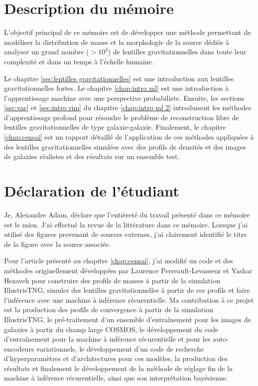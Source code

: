 \section{Description du mémoire}

L'objectif principal de ce mémoire est de développer une méthode permettant de 
modéliser la distribution de masse et 
la morphologie de la source dédiée à analyser un grand nombre ($> 10^{3}$)
de lentilles gravitationnelles dans toute leur complexité et dans un temps à l'échelle humaine. 

Le chapitre \ref{sec:lentilles gravitationnelles} est une introduction aux lentilles gravitationnelles fortes. Le chapitre \ref{chap:intro ml} est 
une introduction à l'apprentissage machine avec une perspective probabiliste. Ensuite, 
les sections \ref{sec:vae} et \ref{sec:intro rim} du chapitre \ref{chap:intro ml 2} introduisent les méthodes d'apprentissage profond 
pour résoudre le problème de reconstruction libre de lentilles gravitationnelles de type galaxie-galaxie. 
Finalement, le chapitre \ref{chap:censai} est un rapport détaillé de l'application de ces méthodes 
appliquées à des lentilles gravitationnelles simulées 
avec des profils de densités et des images de galaxies réalistes 
et des résultats sur un ensemble test. 

\section{Déclaration de l'étudiant}
Je, Alexandre Adam, déclare que l'entièreté du travail présenté dans ce mémoire est le mien. J'ai effectué la revue de 
la littérature dans ce mémoire. Lorsque j'ai utilisé des figures provenant de sources externes, j'ai clairement 
identifié le titre de la figure avec la source associée.

Pour l'article présenté au chapitre \ref{chap:censai}, j'ai modifié un code et des méthodes originellement 
développées par Laurence Perreault-Levasseur et Yashar Hezaveh pour construire des profils de masses à partir 
de la simulation IllustrisTNG, simuler des lentilles gravitationnelles à partir de ces profils et faire l'inférence avec une 
machine à inférence récurentielle. Ma contribution à ce projet est la 
production des profils de convergence à partir de la simulation IllustrisTNG, le pré-traitement 
d'un ensemble d'entraînement pour les images de galaxies à partir du champ large COSMOS, le 
développement du code d'entraînement pour la machine à inférence récurentielle et pour les auto-encodeurs 
variationnels, le développement d'un code de recherche d'hyperparamètres et d'architectures pour ces modèles, 
la production des résultats et finalement 
le développement de la méthode de réglage fin de la machine à inférence récurentielle, 
ainsi que son interprétation bayésienne.

